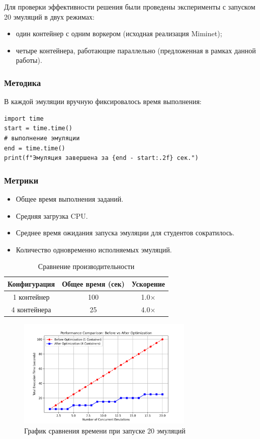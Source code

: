 Для проверки эффективности решения были проведены эксперименты с запуском 20 эмуляций в двух режимах:
\begin{itemize}
  \item один контейнер с одним воркером (исходная реализация Miminet);
  \item четыре контейнера, работающие параллельно (предложенная в рамках данной работы).
\end{itemize}

\subsubsection*{Методика}

В каждой эмуляции вручную фиксировалось время выполнения:

\begin{verbatim}
import time
start = time.time()
# выполнение эмуляции
end = time.time()
print(f"Эмуляция завершена за {end - start:.2f} сек.")
\end{verbatim}

\subsubsection*{Метрики}
\begin{itemize}
  \item Общее время выполнения заданий.
  \item Средняя загрузка CPU.
  \item Среднее время ожидания запуска эмуляции для студентов сократилось.
  \item Количество одновременно исполняемых эмуляций.
\end{itemize}

\begin{table}[H]
\centering
\caption{Сравнение производительности}
\label{tab:cmp}
\begin{tabular}{|c|c|c|}
\hline
Конфигурация & Общее время (сек) & Ускорение \\
\hline
1 контейнер & 100 & 1.0$\times$ \\
4 контейнера & 25 & 4.0$\times$ \\
\hline
\end{tabular}
\end{table}

\begin{figure}[H]
  \centering
  \includegraphics[width=0.75\textwidth]{figures/performance_comparison.png}
  \caption{График сравнения времени при запуске 20 эмуляций}
  \label{fig:perf}
\end{figure}

